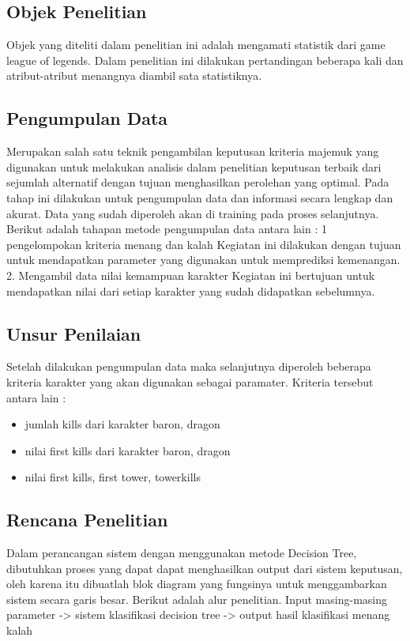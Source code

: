 \documentclass[conference]{IEEEtran}
\begin{document}
\subsection{Objek Penelitian}
Objek yang diteliti dalam penelitian ini adalah mengamati statistik dari game league of legends. Dalam penelitian ini dilakukan pertandingan beberapa kali dan atribut-atribut menangnya diambil sata statistiknya.

\subsection{Pengumpulan Data}
Merupakan salah satu teknik pengambilan keputusan kriteria majemuk yang digunakan untuk melakukan analisis dalam penelitian keputusan terbaik dari sejumlah alternatif dengan tujuan menghasilkan perolehan yang optimal.
Pada tahap ini dilakukan untuk pengumpulan data dan informasi secara lengkap dan akurat. Data yang sudah diperoleh akan di training pada proses selanjutnya. Berikut adalah tahapan metode pengumpulan data antara lain :
1 pengelompokan kriteria menang dan kalah 
Kegiatan ini dilakukan dengan tujuan untuk mendapatkan parameter yang digunakan untuk memprediksi kemenangan.
2. Mengambil data nilai kemampuan karakter
Kegiatan ini bertujuan untuk mendapatkan nilai dari setiap karakter yang sudah didapatkan sebelumnya.

\subsection{Unsur Penilaian}
Setelah dilakukan pengumpulan data maka selanjutnya diperoleh beberapa kriteria karakter yang akan digunakan sebagai paramater. Kriteria tersebut antara lain :
\begin{itemize}
\item jumlah kills dari karakter baron, dragon
\item nilai first kills dari karakter baron, dragon
\item nilai first kills, first tower, towerkills
\end{itemize}

\subsection{Rencana Penelitian}
Dalam perancangan sistem dengan menggunakan metode Decision Tree, dibutuhkan proses yang dapat dapat menghasilkan output dari sistem keputusan, oleh karena itu dibuatlah blok diagram yang fungsinya untuk menggambarkan sistem secara garis besar. Berikut adalah alur penelitian. 
Input masing-masing parameter -> sistem klasifikasi decision tree -> output hasil klasifikasi menang kalah
\end{document}
